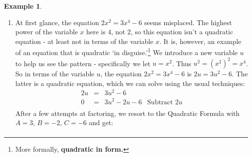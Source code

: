 \documentclass[11pt]{article}
\theoremstyle{definition}  %
\newtheorem{ex}{\bf Example}
\begin{document}
\begin{ex}
\begin{enumerate}
\[\begin{array}{rclr}
& = &  \dfrac{-100\sqrt{3} \pm 8\sqrt{530}}{-98}  & \\ [10pt]

& = &  \dfrac{2(-50\sqrt{3} \pm 4\sqrt{530})}{2(-49)}  & \\ [10pt]

& = &  \dfrac{-50\sqrt{3} \pm 4\sqrt{530}}{-49}  & \text{Reduce} \\ [10pt]

& = &  \dfrac{-(-50\sqrt{3} \pm 4\sqrt{530})}{49}  & \text{Properties of Negatives} \\ [10pt]

& = & \dfrac{50\sqrt{3} \mp 4\sqrt{530}}{49} & \text{Distribute} \\ 

\end{array}\]

You'll note that when we `distributed' the negative in the last step, we changed the `$\pm$' to a `$\mp$.'  While this is technically correct, at the end of the day both symbols mean `plus or minus',\footnote{There are instances where we need both symbols, however.  For example, the Sum and Difference of Cubes Formulas can be written as a single formula:  $a^3 \pm b^3 = (a \pm b) (a^2 \mp ab + b^2)$.  In this case, all of the `top' symbols are read to give the sum formula;  the `bottom' symbols give the difference formula.} so we can write our answers as $t =  \frac{50\sqrt{3} \pm 4\sqrt{530}}{49}$. Checking these answers are a true test of arithmetic mettle.

\item At first glance, the equation $2x^2 = 3x^4 - 6$ seems misplaced.  The highest power of the variable $x$ here is $4$, not $2$, so this equation isn't a quadratic equation - at least not in terms of the variable $x$.  It is, however, an example of an equation that is quadratic `in disguise.'\footnote{More formally, \textbf{quadratic in form.}} We introduce a new variable $u$ to help us see the pattern - specifically we let $u = x^2$.  Thus $u^2 = (x^2)^2 = x^4$.  So in terms of the variable $u$, the equation $2x^2 = 3x^4 - 6$ is $2u = 3u^2 - 6$.  The latter is a quadratic equation, which we can solve using the usual techniques:\[ \begin{array}{rclr}

2u & = & 3u^2 - 6 & \\

0 & = & 3u^2 - 2u - 6 & \text{Subtract $2u$} \\

\end{array}\] After a few attempts at factoring, we resort to the Quadratic Formula with $A = 3$, $B = -2$, $C = -6$ and get:\[ \begin{array}{rclr}


\end{array}\]
\end{enumerate}
\end{ex}
\end{document}
